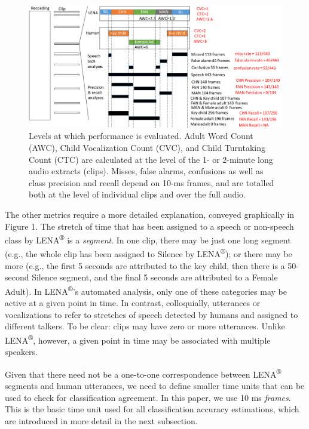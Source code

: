 \documentclass[english,floatsintext,man]{apa6}
\begin{document}
\begin{figure}
\centering
\includegraphics{fig_levels.pdf}
\caption{Levels at which performance is evaluated. Adult Word Count
(AWC), Child Vocalization Count (CVC), and Child Turntaking Count (CTC)
are calculated at the level of the 1- or 2-minute long audio extracts
(clips). Misses, false alarms, confusions as well as class precision and
recall depend on 10-ms frames, and are totalled both at the level of
individual clips and over the full audio.}
\end{figure}

The other metrics require a more detailed explanation, conveyed
graphically in Figure 1. The stretch of time that has been assigned to a
speech or non-speech class by LENA\textsuperscript{®} is a
\emph{segment}. In one clip, there may be just one long segment (e.g.,
the whole clip has been assigned to Silence by LENA\textsuperscript{®});
or there may be more (e.g., the first 5 seconds are attributed to the
key child, then there is a 50-second Silence segment, and the final 5
seconds are attributed to a Female Adult). In LENA\textsuperscript{®}'s
automated analysis, only one of these categories may be active at a
given point in time. In contrast, colloquially, utterances or
vocalizations to refer to stretches of speech detected by humans and
assigned to different talkers. To be clear: clips may have zero or more
utterances. Unlike LENA\textsuperscript{®}, however, a given point in
time may be associated with multiple speakers.

Given that there need not be a one-to-one correspondence between
LENA\textsuperscript{®} segments and human utterances, we need to define
smaller time units that can be used to check for classification
agreement. In this paper, we use 10 ms \emph{frames}. This is the basic
time unit used for all classification accuracy estimations, which are
introduced in more detail in the next subsection.
\end{document}
